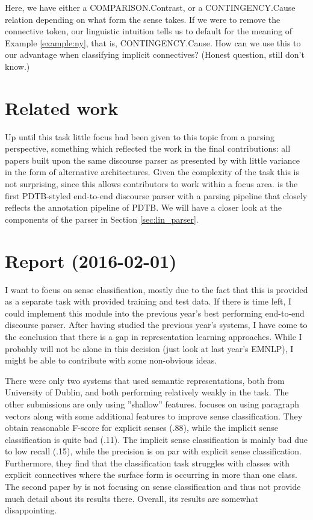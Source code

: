 Here, we have either a COMPARISON.Contrast, or a CONTINGENCY.Cause relation depending on what form the sense takes. If we were to remove the connective token, our linguistic intuition tells us to default for the meaning of Example \ref{example:ny}, that is, CONTINGENCY.Cause. How can we use this to our advantage when classifying implicit connectives? (Honest question, still don't know.)

\section{Related work}

Up until this task little focus had been given to this topic from a parsing perspective, something which reflected the work in the final contributions: all papers built upon the same discourse parser as presented by \cite{lin_pdtbstyled_2014} with little variance in the form of alternative architectures. Given the complexity of the task this is not surprising, since this allows contributors to work within a focus area. \cite{lin_pdtbstyled_2014} is the first PDTB-styled end-to-end discourse parser with a parsing pipeline that closely reflects the annotation pipeline of PDTB. We will have a closer look at the components of the parser in Section \ref{sec:lin_parser}.


\section{Report (2016-02-01)}

I want to focus on sense classification, mostly due to the fact that this is provided as a separate task with provided training and test data. If there is time left, I could implement this module into the previous year's best performing end-to-end discourse parser. After having studied the previous year's systems, I have come to the conclusion that there is a gap in representation learning approaches. While I probably will not be alone in this decision (just look at last year's EMNLP), I might be able to contribute with some non-obvious ideas.

There were only two systems that used semantic representations, both from University of Dublin, and both performing relatively weakly in the task. The other submissions are only using ''shallow'' features. \cite{okita_dcu_2015} focuses on using paragraph vectors along with some additional features to improve sense classification. They obtain reasonable F-score for explicit senses (.88), while the implicit sense classification is quite bad (.11). The implicit sense classification is mainly bad due to low recall (.15), while the precision is on par with explicit sense classification. Furthermore, they find that the classification task struggles with classes with explicit connectives where the surface form is occurring in more than one class. The second paper by \cite{wang_dcu_2015} is not focusing on sense classification and thus not provide much detail about its results there. Overall, its results are somewhat disappointing.

